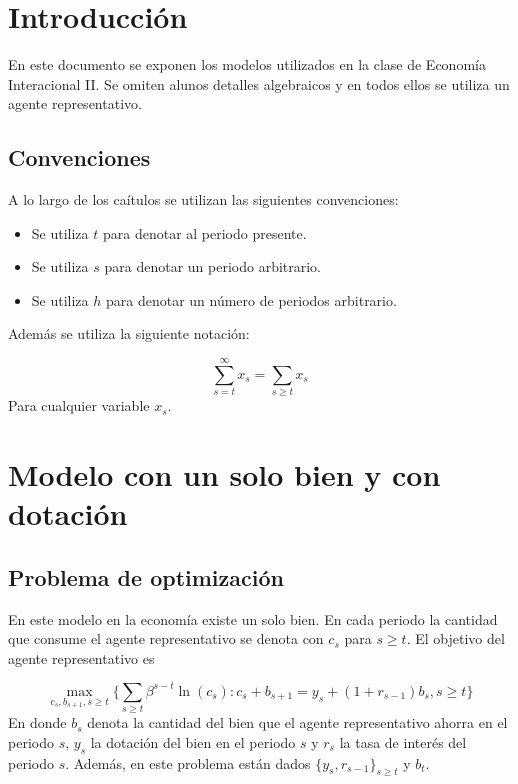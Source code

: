 \documentclass[]{article}
\title{}
\author{}
\date{}
\providecommand{\tightlist}{%
  \setlength{\itemsep}{0pt}\setlength{\parskip}{0pt}}
\begin{document}
{
\setcounter{tocdepth}{2}
\tableofcontents
}
\section{Introducción}\label{introduccion}

En este documento se exponen los modelos utilizados en la clase de
Economía Interacional II. Se omiten alunos detalles algebraicos y en
todos ellos se utiliza un agente representativo.

\subsection{Convenciones}\label{convenciones}

A lo largo de los caítulos se utilizan las siguientes convenciones:

\begin{itemize}
\tightlist
\item
  Se utiliza \(t\) para denotar al periodo presente.
\item
  Se utiliza \(s\) para denotar un periodo arbitrario.
\item
  Se utiliza \(h\) para denotar un número de periodos arbitrario.
\end{itemize}

Además se utiliza la siguiente notación:

\[
\sum_{s = t}^\infty x_s = \sum_{s \geq t} x_s
\] Para cualquier variable \(x_s\).

\section{Modelo con un solo bien y con
dotación}\label{modelo-con-un-solo-bien-y-con-dotacion}

\subsection{Problema de optimización}\label{problema-de-optimizacion}

En este modelo en la economía existe un solo bien. En cada periodo la
cantidad que consume el agente representativo se denota con \(c_s\) para
\(s\geq t\). El objetivo del agente representativo es

\[
\max_{c_s, b_{s+1}, s \geq t} \{ \sum_{s\geq t} \beta^{s-t}\ln(c_s):  c_s + b_{s+1} = y_s + (1+r_{s-1})b_s, s \geq t\}
\] En donde \(b_s\) denota la cantidad del bien que el agente
representativo ahorra en el periodo \(s\), \(y_s\) la dotación del bien
en el periodo \(s\) y \(r_s\) la tasa de interés del periodo \(s\).
Además, en este problema están dados \(\{y_s, r_{s-1}\}_{s\geq t}\) y
\(b_t\).
\end{document}
